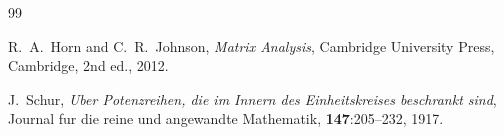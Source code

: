 \documentclass[11pt,a4paper]{article}
\theoremstyle{definition}
\begin{document}
\begin{thebibliography}{99}

R.~A.~Horn and C.~R.~Johnson,
\textit{Matrix Analysis},
Cambridge University Press, Cambridge, 2nd ed., 2012.

J.~Schur,
\textit{Uber Potenzreihen, die im Innern des Einheitskreises beschrankt sind},
Journal fur die reine und angewandte Mathematik, \textbf{147}:205--232, 1917.

\end{thebibliography}
\end{document}
